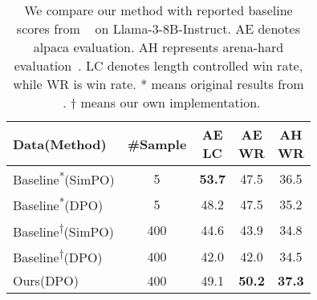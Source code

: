 \begin{table}[t]
\centering
\small
\begin{tabular}{lcccc}
\toprule
\textbf{Data(Method)} & \textbf{\#Sample} & \makecell{\textbf{AE}\\\textbf{LC}} & \makecell{\textbf{AE}\\\textbf{WR}} & \makecell{\textbf{AH}\\\textbf{WR}} \\
\midrule
Baseline\textsuperscript{*}(SimPO) & 5 & \textbf{53.7} & 47.5 & 36.5 \\
Baseline\textsuperscript{*}(DPO) & 5 & 48.2 &	47.5 & 35.2 \\
Baseline\textsuperscript{†}(SimPO) & 400 & 44.6 & 43.9 &  34.8 \\
Baseline\textsuperscript{†}(DPO) & 400 & 42.0 & 42.0 &  34.5 \\
\midrule
Ours(DPO) & 400 & 49.1 & \textbf{50.2} & \textbf{37.3} \\
\bottomrule
\end{tabular}
\caption{We compare our method with reported baseline scores from  ~\citet{meng2024simpo} on Llama-3-8B-Instruct. 
AE denotes alpaca evaluation. AH represents arena-hard evaluation~\cite{li2024crowdsourceddatahighqualitybenchmarks}.
LC denotes length controlled win rate, while WR is win rate.
* means original results from ~\citet{meng2024simpo}.
† means our own implementation.}
\label{compare_literature}
\vspace{-1em}
\end{table}
